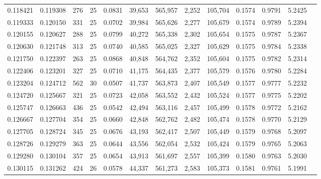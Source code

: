 \begin{tabular}{rrrrrrrrrrrrr}
0.118421 & 0.119308 &   276 &  25 &                                     0.0831 &  39,653 & 565,957 &   2,252 & 105,704 & 0.1574 & 0.9791 & 5.2425 \\
0.119333 & 0.120150 &   331 &  25 &                                     0.0702 &  39,984 & 565,626 &   2,277 & 105,679 & 0.1574 & 0.9789 & 5.2394 \\
0.120155 & 0.120627 &   288 &  25 &                                     0.0799 &  40,272 & 565,338 &   2,302 & 105,654 & 0.1575 & 0.9787 & 5.2367 \\
0.120630 & 0.121748 &   313 &  25 &                                     0.0740 &  40,585 & 565,025 &   2,327 & 105,629 & 0.1575 & 0.9784 & 5.2338 \\
0.121750 & 0.122397 &   263 &  25 &                                     0.0868 &  40,848 & 564,762 &   2,352 & 105,604 & 0.1575 & 0.9782 & 5.2314 \\
0.122406 & 0.123201 &   327 &  25 &                                     0.0710 &  41,175 & 564,435 &   2,377 & 105,579 & 0.1576 & 0.9780 & 5.2284 \\
0.123204 & 0.124712 &   562 &  30 &                                     0.0507 &  41,737 & 563,873 &   2,407 & 105,549 & 0.1577 & 0.9777 & 5.2232 \\
0.124720 & 0.125667 &   321 &  25 &                                     0.0723 &  42,058 & 563,552 &   2,432 & 105,524 & 0.1577 & 0.9775 & 5.2202 \\
0.125747 & 0.126663 &   436 &  25 &                                     0.0542 &  42,494 & 563,116 &   2,457 & 105,499 & 0.1578 & 0.9772 & 5.2162 \\
0.126667 & 0.127704 &   354 &  25 &                                     0.0660 &  42,848 & 562,762 &   2,482 & 105,474 & 0.1578 & 0.9770 & 5.2129 \\
0.127705 & 0.128724 &   345 &  25 &                                     0.0676 &  43,193 & 562,417 &   2,507 & 105,449 & 0.1579 & 0.9768 & 5.2097 \\
0.128726 & 0.129279 &   363 &  25 &                                     0.0644 &  43,556 & 562,054 &   2,532 & 105,424 & 0.1579 & 0.9765 & 5.2063 \\
0.129280 & 0.130104 &   357 &  25 &                                     0.0654 &  43,913 & 561,697 &   2,557 & 105,399 & 0.1580 & 0.9763 & 5.2030 \\
0.130115 & 0.131262 &   424 &  26 &                                     0.0578 &  44,337 & 561,273 &   2,583 & 105,373 & 0.1581 & 0.9761 & 5.1991 \\

\end{tabular}
